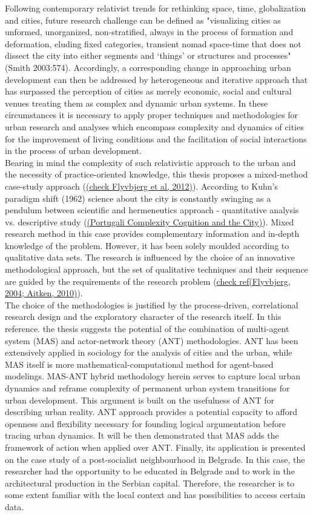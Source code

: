 \documentclass[11pt]{report}
\begin{document}
Following contemporary relativist trends for rethinking space, time, globalization and cities, future research challenge can be defined as "visualizing cities as unformed, unorganized, non-stratified, always in the process of formation and deformation, eluding fixed categories, transient nomad space-time that does not dissect the city into either segments and ‘things’ or structures and processes" (Smith 2003:574). Accordingly, a corresponding change in approaching urban development can then be addressed by heterogeneous and iterative approach that has surpassed the perception of cities as merely economic, social and cultural venues treating them as complex and dynamic urban systems. In these circumstances it is necessary to apply proper techniques and methodologies for urban research and analyses which encompass complexity and dynamics of cities for the improvement of living conditions and the facilitation of social interactions in the process of urban development. 
\\
Bearing in mind the complexity of such relativistic approach to the urban and the necessity of practice-oriented knowledge, this thesis proposes a mixed-method case-study approach (\href{ref}{(check Flyvbjerg et al, 2012)}). According to Kuhn's paradigm shift (1962) science about the city is constantly swinging as a pendulum between scientific and hermeneutics approach - quantitative analysis vs. descriptive study (\href{ref}{(Portugali Complexity Cognition and the City)}). Mixed research method in this case provides complementary information and in-depth knowledge of the problem. However, it has been solely moulded according to qualitative data sets. The research is influenced by the choice of an innovative methodological approach,  but  the  set of qualitative techniques  and  their  sequence  are  guided by the requirements of the research problem (\href{ref}{check ref(Flyvbjerg, 2004; Aitken, 2010)}).
\\
The choice of the methodologies is justified by the process-driven, correlational research design and the exploratory character of the research itself. In this reference. the thesis suggests the potential of the combination of multi-agent system (MAS) and actor-network theory (ANT) methodologies. ANT has been extensively applied in sociology for the analysis of cities and the urban, while MAS itself is more mathematical-computational method for agent-based modelings. MAS-ANT hybrid methodology  herein serves to capture local urban dynamics and reframe complexity of permanent urban system transitions for urban development. This argument is built on the usefulness of ANT for describing urban reality. ANT approach provides a potential capacity to afford openness and flexibility necessary for founding logical argumentation before tracing urban dynamics. It will be then demonstrated that MAS adds the framework of action when applied over ANT. Finally, its application is presented on the case study of a post-socialist neighbourhood in Belgrade. In this case, the researcher had the opportunity to be educated in Belgrade and to work in the architectural production in the Serbian capital. Therefore, the  researcher is  to  some  extent  familiar  with  the  local  context  and has possibilities to access certain data.
\end{document}
